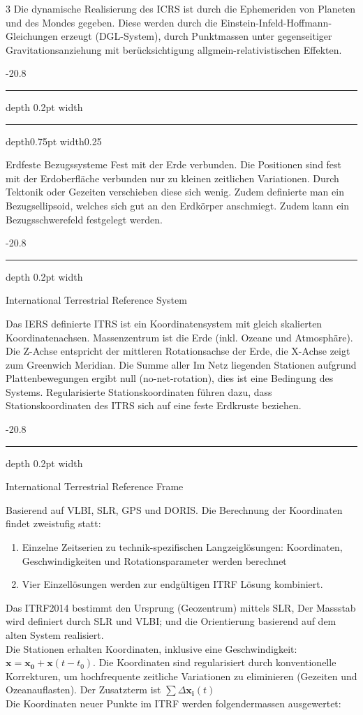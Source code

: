 \documentclass[8pt, landscape, fleqn]{scrartcl}
\makeatletter
\renewcommand{\subsection}{\@startsection{subsection}{1}{0mm}%
{-2\baselineskip}{0.8\baselineskip}%
{\hrule depth 0.2pt width\columnwidth\hrule depth0.75pt
width0.25\columnwidth\vspace*{1.2em}\large\bfseries\rmfamily}}
\renewcommand{\subsubsection}{\@startsection{subsubsection}{1}{0mm}%
{-2\baselineskip}{0.8\baselineskip}%
{\hrule depth 0.2pt width\columnwidth\vspace*{1.2em}\normalsize\bfseries\rmfamily}}
\makeatother
\begin{document}
\begin{multicols*}{3}
Die dynamische Realisierung des ICRS ist durch die Ephemeriden von Planeten und des Mondes gegeben. Diese werden durch die Einstein-Infeld-Hoffmann-Gleichungen erzeugt (DGL-System), durch Punktmassen unter gegenseitiger Gravitationsanziehung mit berücksichtigung allgmein-relativistischen Effekten.

\subsection{Erdfeste Bezugssysteme}
Fest mit der Erde verbunden. Die Positionen sind fest mit der Erdoberfläche verbunden nur zu kleinen zeitlichen Variationen. Durch Tektonik oder Gezeiten verschieben diese sich wenig. Zudem definierte man ein Bezugsellipsoid, welches sich gut an den Erdkörper anschmiegt. Zudem kann ein Bezugsschwerefeld festgelegt werden.

\subsubsection{International Terrestrial Reference System}

Das IERS definierte ITRS ist ein Koordinatensystem mit gleich skalierten Koordinatenachsen. Massenzentrum ist die Erde (inkl. Ozeane und Atmosphäre). Die Z-Achse entspricht der mittleren Rotationsachse der Erde, 
die X-Achse zeigt zum Greenwich Meridian. Die Summe aller Im Netz liegenden Stationen aufgrund Plattenbewegungen ergibt null (no-net-rotation), dies ist eine Bedingung des Systems. Regularisierte Stationskoordinaten führen dazu, dass Stationskoordinaten des ITRS sich auf eine feste Erdkruste beziehen.

\subsubsection{International Terrestrial Reference Frame}

Basierend auf VLBI, SLR, GPS und DORIS. Die Berechnung der Koordinaten findet zweistufig statt:

\begin{enumerate}
    \item Einzelne Zeitserien zu technik-spezifischen Langzeiglösungen: Koordinaten, Geschwindigkeiten und Rotationsparameter werden berechnet
    \item Vier Einzellösungen werden zur endgültigen ITRF Lösung kombiniert.
\end{enumerate}

Das ITRF2014 bestimmt den Ursprung (Geozentrum) mittels SLR, Der Massstab wird definiert durch SLR und VLBI; und die Orientierung basierend auf dem alten System realisiert. \\
Die Stationen erhalten Koordinaten, inklusive eine Geschwindigkeit: $\mathbf{x} = \mathbf{x_0} + \mathbf{x}(t-t_0)$. Die Koordinaten sind regularisiert durch konventionelle Korrekturen, um hochfrequente zeitliche Variationen zu eliminieren (Gezeiten und Ozeanauflasten). Der Zusatzterm ist $\sum \Delta \mathbf{x_i}(t)$ \\
Die Koordinaten neuer Punkte im ITRF werden folgendermassen ausgewertet:


\end{multicols*}
\end{document}
